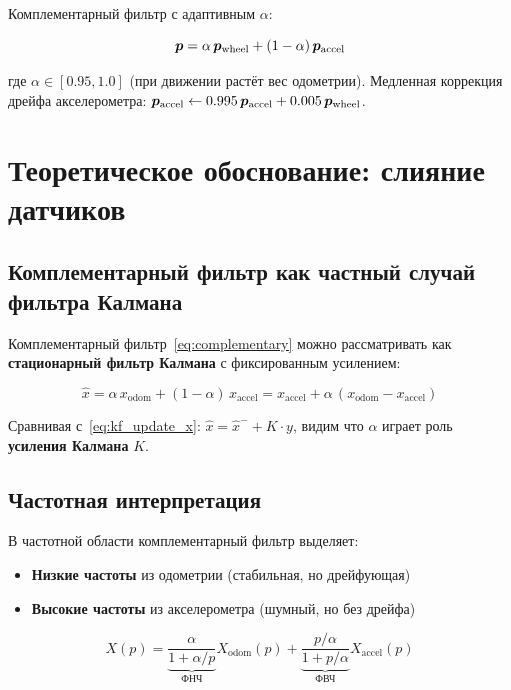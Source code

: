 Комплементарный фильтр с адаптивным $\alpha$:

\begin{equation}
  \bm{p} = \alpha\,\bm{p}_{\text{wheel}} + (1-\alpha)\,\bm{p}_{\text{accel}}
  \label{eq:complementary}
\end{equation}

где $\alpha \in [0.95, 1.0]$ (при движении растёт вес одометрии).
Медленная коррекция дрейфа акселерометра:
$\bm{p}_{\text{accel}} \leftarrow 0.995\,\bm{p}_{\text{accel}} + 0.005\,\bm{p}_{\text{wheel}}$.

\section{Теоретическое обоснование: слияние датчиков}

\subsection{Комплементарный фильтр как частный случай фильтра Калмана}

Комплементарный фильтр~\eqref{eq:complementary} можно рассматривать
как \textbf{стационарный фильтр Калмана} с фиксированным усилением:

\begin{equation}
  \hat{x} = \alpha\,x_{\text{odom}} + (1-\alpha)\,x_{\text{accel}}
  = x_{\text{accel}} + \alpha\,(x_{\text{odom}} - x_{\text{accel}})
  \label{eq:comp_as_kalman}
\end{equation}

Сравнивая с~\eqref{eq:kf_update_x}: $\hat{x} = \hat{x}^- + K\cdot y$,
видим что $\alpha$ играет роль \textbf{усиления Калмана} $K$.

\subsection{Частотная интерпретация}

В частотной области комплементарный фильтр выделяет:
\begin{itemize}
  \item \textbf{Низкие частоты} из одометрии (стабильная, но дрейфующая)
  \item \textbf{Высокие частоты} из акселерометра (шумный, но без дрейфа)
\end{itemize}

\begin{equation}
  X(p) = \underbrace{\frac{\alpha}{1 + \alpha/p}}_{\text{ФНЧ}} X_{\text{odom}}(p)
       + \underbrace{\frac{p/\alpha}{1 + p/\alpha}}_{\text{ФВЧ}} X_{\text{accel}}(p)
  \label{eq:comp_frequency}
\end{equation}

